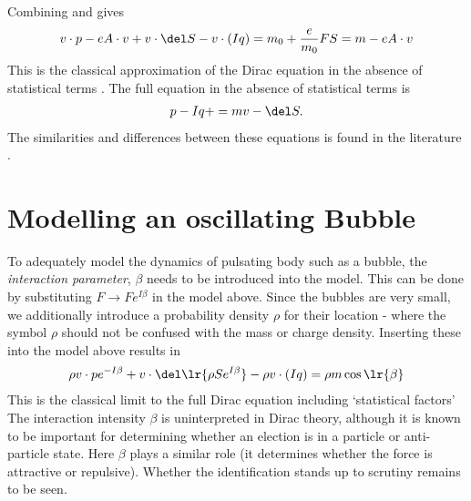 Combining  and  gives
\begin{align}
   v \cdot p- eA\cdot v  + v \cdot \del  S - v\cdot  (I q)=m_0 + \frac{e}{m_0} F S = m - eA\cdot v 
\end{align}
This is the classical approximation  of the Dirac equation in the absence of statistical terms \cite{Hestenes1990}.
The full  equation in the absence of statistical terms is 
\begin{align}
 p -Iq +  = mv - \del S.
\end{align}
The similarities and differences  between these equations is found in the literature \cite{Hestenes1990}.

\section{Modelling an oscillating Bubble}\label{sec:bubble}


To adequately model the dynamics of pulsating body such as a bubble, the  {\em interaction parameter}, $\beta$  needs to be introduced into the model.
This can be done by substituting  $F \rightarrow F e^{I\beta}$ in the model above.
Since the bubbles are very small, we additionally introduce a probability density $\rho$ for their location 
- where the symbol $\rho$ should not be confused with the mass or charge density.
Inserting these into the model above results in
\begin{align}
   \rho v \cdot p e^{-I\beta}  + v \cdot \del  \lr{\rho S e^{I\beta}} - \rho v\cdot  (I q)= \rho m \cos\lr{\beta}
\end{align}
This is the classical limit to the full Dirac equation including `statistical factors' \cite{Hestenes1973}
The interaction intensity $\beta$ is uninterpreted in Dirac theory, although it is known to be important for determining whether an election is in a particle or anti-particle state.
Here $\beta$ plays a similar role (it determines whether the force is attractive or repulsive).
Whether the identification stands up to scrutiny remains to be seen.

